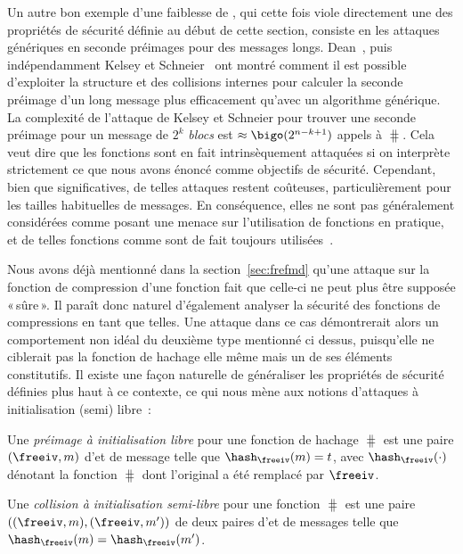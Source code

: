 Un autre bon exemple d'une faiblesse de
\merkdam, qui cette fois viole directement une des propriétés de sécurité définie au début de cette section,
consiste en les attaques génériques en seconde préimages pour des messages longs.
Dean~\cite{dean}, puis indépendamment Kelsey et Schneier~\cite{DBLP:conf/eurocrypt/KelseyS05}
ont montré comment il est possible d'exploiter la structure \merkdam et des collisions internes
pour calculer la seconde préimage d'un long message plus efficacement qu'avec un algorithme générique.
La complexité de l'attaque de Kelsey et Schneier pour trouver une seconde préimage pour un message de 
$2^k$ \emph{blocs} est $\approx \bigo(2^{n-k+1})$ appels à $\hash$. Cela veut dire que les fonctions \merkdam sont
en fait intrinsèquement attaquées si on interprète strictement ce que nous avons énoncé comme objectifs de sécurité.
Cependant, bien que significatives, de telles attaques restent coûteuses, particulièrement pour les tailles habituelles
de messages. En conséquence, elles ne sont pas généralement considérées comme posant une menace sur l'utilisation
de fonctions \merkdam en pratique, et de telles fonctions comme \shatwo sont de fait toujours utilisées~\cite{Nist-SHA}.

\bigskip

Nous avons déjà mentionné dans la section~\ref{sec:frefmd} qu'une attaque sur la fonction de compression d'une fonction \merkdam fait que celle-ci
ne peut plus être supposée «\,sûre\,». Il paraît donc naturel d'également analyser la sécurité des fonctions de compressions en tant que telles.
Une attaque dans ce cas démontrerait alors un comportement non idéal du deuxième type mentionné ci dessus, puisqu'elle ne ciblerait
pas la fonction de hachage elle même mais un de ses éléments constitutifs. Il existe une façon naturelle de généraliser les propriétés
de sécurité définies plus haut à ce contexte, ce qui nous mène aux notions d'attaques à initialisation (semi) libre~:

\begin{fdefi}
Une 
\emph{préimage à initialisation libre}
pour une fonction de hachage \merkdam $\hash$ est une paire $(\freeiv,m)$
d'\iv et de message telle que $\hash_\freeiv(m) = t$, avec $\hash_\freeiv(\cdot)$ dénotant
la fonction $\hash$ dont l'\iv original a été remplacé par $\freeiv$.
\end{fdefi}

\begin{fdefi}
Une \emph{collision à initialisation semi-libre} pour une fonction \merkdam $\hash$ est une paire $((\freeiv,m), (\freeiv,m'))$
de deux paires d'\iv et de messages telle que $\hash_\freeiv(m) = \hash_{\freeiv}(m')$.
\end{fdefi}

